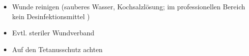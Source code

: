\label{m:ehi-bagatellverletzungen}
\begin{itemize}
  \item Wunde reinigen (sauberes Wasser, Kochsalzlösung; im professionellen Bereich kein Desinfektionsmittel 
  \cite{Fernandez2012,Franz2012,Schupp2009,Marquardt2010})
  \item Evtl. steriler Wundverband
  \item Auf den Tetanusschutz achten
\end{itemize}